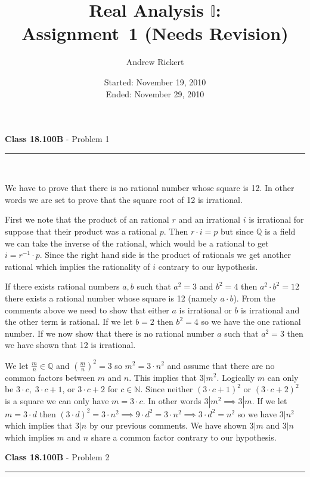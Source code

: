 \documentclass[11pt,reqno]{article}
\title{Real Analysis $\mathbb{I}$: \\ Assignment \,1 (Needs Revision)}
\author{Andrew Rickert}
\date{Started: November 19, 2010 \\ \hspace{1pt} Ended: November 29, 2010}                                           %
\begin{document}
\maketitle


\begin{flushleft} 
\textbf{Class 18.100B} - Problem 1\\
\rule{500pt}{1pt}\\
\end{flushleft} 
	We have to prove that there is no rational number whose square is 12. In other words we are set to prove that the square root of 12 is irrational. 
	
First we note that the product of an rational $r$ and an irrational $i$ is irrational for suppose that their product was a rational $p$. Then $r \cdot i = p$ but since $\mathbb{Q}$ is a field we can take the inverse of the rational, which would be a rational to get $i = r^{-1} \cdot p$. Since the right hand side is the product of rationals we get another rational which implies the rationality of $i$ contrary to our hypothesis. 

If there exists rational numbers $a, b$ such that $a^2 = 3$ and $b^2 = 4$ then $a^2 \cdot b^2 = 12$ there exists a rational number whose square is 12 (namely $a \cdot b$). From the comments above we need to show that either $a$ is irrational or $b$ is irrational and the other term is rational. If we let $b = 2$ then $b^2 = 4$ so we have the one rational number. If we now show that there is no rational number $a$ such that $a^2 = 3$ then we have shown that 12 is irrational.

We let $\frac{m}{n} \in \mathbb{Q}$ and   $(\frac{m}{n})^2 = 3$ so $m^2 = 3 \cdot n^2$ and assume that there are no common factors between $m$ and $n$. This implies that $3|m^2$. Logically $m$ can only be $3\cdot c, \; 3 \cdot c + 1$, or $3 \cdot c + 2$ for $c \in \mathbb{N}$. Since neither $(3 \cdot c + 1)^2$ or $(3 \cdot c + 2)^2$ is a square we can only have $m = 3 \cdot c$. In other words $3|m^2 \implies 3|m$. If we let $m = 3 \cdot d$ then $(3 \cdot d)^2 = 3 \cdot n^2 \implies 9 \cdot d^2 = 3 \cdot n^2 \implies 3 \cdot d^2 = n^2$ so we have $3|n^2$ which implies that $3|n$ by our previous comments. We have shown $3|m$ and $3|n$ which implies $m$ and $n$ share a common factor contrary to our hypothesis.

\vspace{15pt}
\begin{flushleft} 
\textbf{Class 18.100B} - Problem 2\\
\rule{500pt}{1pt}\\
\end{flushleft} 
\end{document}
